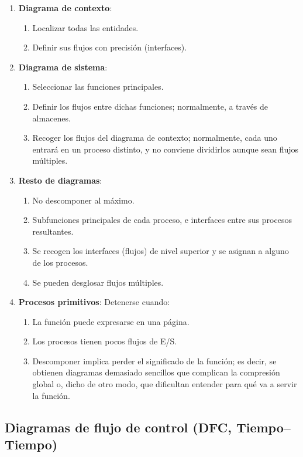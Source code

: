 \begin{enumerate}
    \item \textbf{Diagrama de contexto}:
    \begin{enumerate}
        \item Localizar todas las entidades.
        \item Definir sus flujos con precisión (interfaces).
    \end{enumerate}
    \item \textbf{Diagrama de sistema}:
    \begin{enumerate}
        \item Seleccionar las funciones principales.
        \item Definir los flujos entre dichas funciones; normalmente, a través de almacenes.
        \item Recoger los flujos del diagrama de contexto; normalmente, cada uno entrará en un proceso distinto, y no conviene dividirlos aunque sean flujos múltiples.
    \end{enumerate}
    \item \textbf{Resto de diagramas}:
    \begin{enumerate}
        \item No descomponer al máximo.
        \item Subfunciones principales de cada proceso, e interfaces entre sus procesos resultantes.
        \item Se recogen los interfaces (flujos) de nivel superior y se asignan a alguno de los procesos.
        \item Se pueden desglosar flujos múltiples.
    \end{enumerate}
    \item \textbf{Procesos primitivos}:
    Detenerse cuando:
    \begin{enumerate}
        \item La función puede expresarse en una página.
        \item Los procesos tienen pocos flujos de E/S.
        \item Descomponer implica perder el significado de la función; es decir, se obtienen diagramas demasiado sencillos que complican la compresión global o, dicho de otro modo, que dificultan entender para qué va a servir la función.
    \end{enumerate}
\end{enumerate}


\subsection{Diagramas de flujo de control (DFC, Tiempo--Tiempo)}

